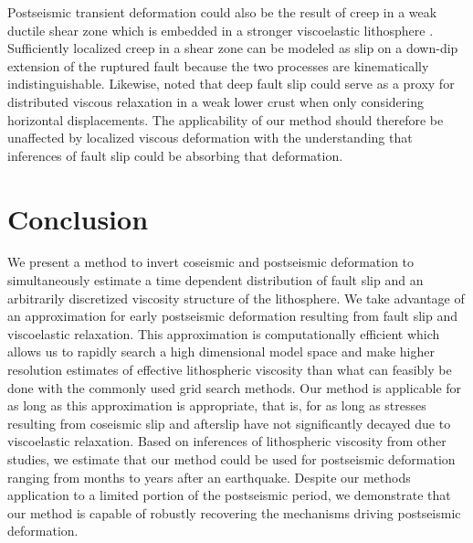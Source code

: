 Postseismic transient deformation could also be the result of creep in
a weak ductile shear zone which is embedded in a stronger viscoelastic
lithosphere \citep[e.g.,][]{Hetland2014}. Sufficiently localized creep
in a shear zone can be modeled as slip on a down-dip extension of the
ruptured fault \citep[e.g.,][]{Hearn2002,Kenner2003,Johnson2004}
because the two processes are kinematically indistinguishable.
Likewise, \citet{Freed2006b} noted that deep fault slip could serve as
a proxy for distributed viscous relaxation in a weak lower crust when
only considering horizontal displacements. The applicability of our
method should therefore be unaffected by localized viscous deformation
with the understanding that inferences of fault slip could be
absorbing that deformation.

\section{Conclusion}
We present a method to invert coseismic and postseismic deformation to
simultaneously estimate a time dependent distribution of fault slip
and an arbitrarily discretized viscosity structure of the lithosphere.
We take advantage of an approximation for early postseismic
deformation resulting from fault slip and viscoelastic relaxation.
This approximation is computationally efficient which allows us to
rapidly search a high dimensional model space and make higher
resolution estimates of effective lithospheric viscosity than what can
feasibly be done with the commonly used grid search methods. Our
method is applicable for as long as this approximation is appropriate,
that is, for as long as stresses resulting from coseismic slip and
afterslip have not significantly decayed due to viscoelastic
relaxation.  Based on inferences of lithospheric viscosity from other
studies, we estimate that our method could be used for postseismic
deformation ranging from months to years after an earthquake. Despite
our methods application to a limited portion of the postseismic
period, we demonstrate that our method is capable of robustly
recovering the mechanisms driving postseismic deformation.

%
%

